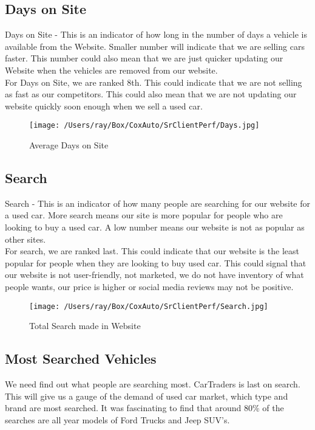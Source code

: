 \documentclass[
	12pt, %
	letterpaper, %
]{tPlate}
\begin{document}
\cleardoublepage

\subsection{Days on Site}
Days on Site - This is an indicator of how long in the number of days a vehicle is available from the Website.  Smaller number will indicate that we are selling cars faster. This number could also mean that we are just quicker updating our Website when the vehicles are removed from our website.  \\
For Days on Site, we are ranked 8th.  This could indicate that we are not selling as fast as our competitors.  This could also mean that we are not updating our website quickly soon enough when we sell a used car.  

\begin{figure}[H]
	\centering
	\texttt{[image: /Users/ray/Box/CoxAuto/SrClientPerf/Days.jpg]}
	\caption[Optional caption]{Average Days on Site}
	\label{fig. 4}
\end{figure}

\subsection{Search}
Search - This is an indicator of how many people are searching for our website for a used car.  More search means our site is more popular for people who are looking to buy a used car.  A low number means our website is not as popular as other sites.\\

For search, we are ranked last. This could indicate that our website is the least popular for people when they are looking to buy used car.  This could signal that our website is not user-friendly, not marketed, we do not have inventory of what people wants, our price is higher or social media reviews may not be positive.  

\begin{figure}[H]
	\centering
	\texttt{[image: /Users/ray/Box/CoxAuto/SrClientPerf/Search.jpg]}
	\caption[Optional caption]{Total Search made in Website}
	\label{fig. 5}
\end{figure}

\subsection{Most Searched Vehicles}
We need find out what people are searching most.  CarTraders is last on search.  This will give us a gauge of the demand of used car market, which type and brand are most searched.  It was fascinating to find that around 80\% of the searches are all year models of Ford Trucks and Jeep SUV's.  
\end{document}

